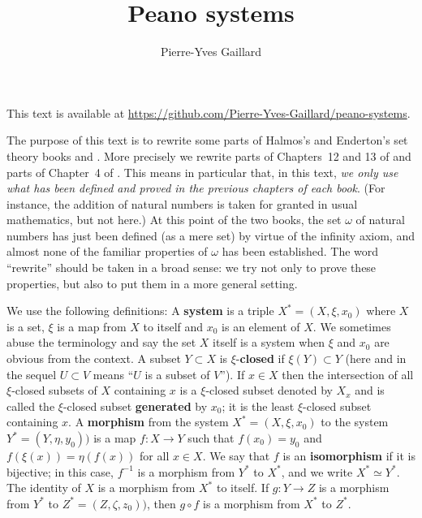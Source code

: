 \documentclass[12pt,letterpaper]{article}
\title{Peano systems} \author{Pierre-Yves Gaillard} \date{}
\begin{document}

\maketitle %
\begin{center}
{\scriptsize This text is available at \url{https://github.com/Pierre-Yves-Gaillard/peano-systems}.}
\end{center}%

The purpose of this text is to rewrite some parts of Halmos's and Enderton's set theory books \cite{halmos_naive_1974} and \cite{Enderton1977}. More precisely we rewrite parts of Chapters~12 and 13 of \cite{halmos_naive_1974} and parts of Chapter~4 of \cite{Enderton1977}. This means in particular that, in this text, \emph{we only use what has been defined and proved in the previous chapters of each book}. (For instance, the addition of natural numbers is taken for granted in usual mathematics, but not here.) At this point of the two books, the set \(\omega\) of natural numbers has just been defined (as a mere set) by virtue of the infinity axiom, and almost none of the familiar properties of \(\omega\) has been established. The word ``rewrite'' should be taken in a broad sense: we try not only to prove these properties, but also to put them in a more general setting. 

We use the following definitions: A \textbf{system} is a triple \(X^*=(X,\xi,x_0)\) where \(X\) is a set, \(\xi\) is a map from \(X\) to itself and \(x_0\) is an element of \(X\). We sometimes abuse the terminology and say the set \(X\) itself is a system when \(\xi\) and \(x_0\) are obvious from the context. A subset \(Y\subset X\) is \(\xi\)-\textbf{closed} if \(\xi(Y)\subset Y\) (here and in the sequel \(U\subset V\) means ``\(U\) is a subset of \(V\)''). If \(x\in X\) then the intersection of all \(\xi\)-closed subsets of \(X\) containing \(x\) is a \(\xi\)-closed subset denoted by \(X_x\) and is called the \(\xi\)-closed subset \textbf{generated} by \(x_0\); it is the least \(\xi\)-closed subset containing \(x\). A \textbf{morphism} from the system \(X^*=(X,\xi,x_0)\) to the system \(Y^*=(Y,\eta,y_0))\) is a map \(f:X\to Y\) such that \(f(x_0)=y_0\) and \(f(\xi(x))=\eta(f(x))\) for all \(x\in X\). We say that \(f\) is an \textbf{isomorphism} if it is bijective; in this case, \(f^{-1}\) is a morphism from \(Y^*\) to \(X^*\), and we write \(X^*\simeq Y^*\). The identity of \(X\) is a morphism from \(X^*\) to itself. If \(g:Y\to Z\) is a morphism from \(Y^*\) to \(Z^*=(Z,\zeta,z_0))\), then \(g\circ f\) is a morphism from \(X^*\) to \(Z^*\). 
\end{document}
